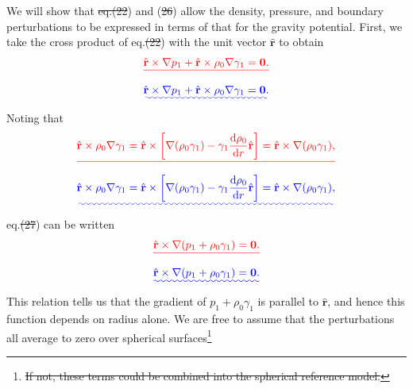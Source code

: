 \documentclass[a4paper,12pt]{paper}
\providecommand{\DIFadd}[1]{{\protect\color{blue}\uwave{#1}}} %
\providecommand{\DIFdel}[1]{{\protect\color{red}\sout{#1}}}                      %
\providecommand{\DIFaddbegin}{} %
\providecommand{\DIFaddend}{} %
\providecommand{\DIFdelbegin}{} %
\providecommand{\DIFdelend}{} %
\begin{document}
We will show that \DIFdelbegin \DIFdel{eq.(22}\DIFdelend \DIFaddbegin \DIFadd{eqs.~(\ref{eq:22}}\DIFaddend ) and (\DIFdelbegin \DIFdel{26}\DIFdelend \DIFaddbegin \DIFadd{\ref{eq:26}}\DIFaddend ) allow the density, pressure, and boundary perturbations to be expressed in terms of 
that for the gravity potential. First, we take the cross product of eq.\DIFdelbegin \DIFdel{(22}\DIFdelend \DIFaddbegin \DIFadd{~(\ref{eq:22}}\DIFaddend ) with the unit vector $\hat{\mathbf{r}}$ to obtain
\DIFdelbegin \begin{displaymath}
\DIFdel{\hat{\mathbf{r}}\times\nabla p_{1}+\hat{\mathbf{r}}\times\rho_{0}\nabla\gamma_{1}=\mathbf{0}.
}\end{displaymath}%
\DIFdelend \DIFaddbegin \begin{equation}
\DIFadd{\hat{\mathbf{r}}\times\nabla p_{1}+\hat{\mathbf{r}}\times\rho_{0}\nabla\gamma_{1}=\mathbf{0}.
\label{eq:27}
}\end{equation}\DIFaddend 
Noting that
\DIFdelbegin \begin{displaymath}
\DIFdel{\hat{\mathbf{r}}\times\rho_{0}\nabla\gamma_{1}=\hat{\mathbf{r}}\times\left[
    \nabla(\rho_{0}\gamma_{1})-\gamma_{1}\frac{\ddns \rho_{0}}{\ddns r}\hat{\mathbf{r}}
    \right]=\hat{\mathbf{r}}\times\nabla(\rho_{0}\gamma_{1}),
}\end{displaymath}%
\DIFdelend \DIFaddbegin \begin{equation}
\DIFadd{\hat{\mathbf{r}}\times\rho_{0}\nabla\gamma_{1}=\hat{\mathbf{r}}\times\left[
    \nabla(\rho_{0}\gamma_{1})-\gamma_{1}\frac{\ddns \rho_{0}}{\ddns r}\hat{\mathbf{r}}
    \right]=\hat{\mathbf{r}}\times\nabla(\rho_{0}\gamma_{1}),
\label{eq:28}
}\end{equation}\DIFaddend 
eq.\DIFdelbegin \DIFdel{(27}\DIFdelend \DIFaddbegin \DIFadd{~(\ref{eq:27}}\DIFaddend ) can be written
\DIFdelbegin \begin{displaymath}
\DIFdel{\hat{\mathbf{r}}\times\nabla(p_{1}+\rho_{0}\gamma_{1})=\mathbf{0}.
}\end{displaymath}%
\DIFdelend \DIFaddbegin \begin{equation}
\DIFadd{\hat{\mathbf{r}}\times\nabla(p_{1}+\rho_{0}\gamma_{1})=\mathbf{0}.
\label{eq:29}
}\end{equation}\DIFaddend 
This relation tells us that the gradient of $p_{1}+\rho_{0}\gamma_{1}$ is parallel to $\hat{\mathbf{r}}$, and hence this function
 depends on radius alone. We are free to assume that the perturbations all average to zero over spherical surfaces\DIFdelbegin \footnote{\DIFdel{If not, 
 these terms could be combined into the spherical reference model.}}%
\end{document}
